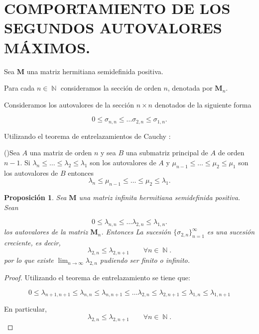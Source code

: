 \documentclass[11pt]{article}
\newtheorem{prop1}{Proposici\'{o}n}%
\newenvironment{prop}{\begin{prop1}\rm}{\end{prop1}}
\DeclareMathOperator{\NN}{\mathbb N}%
\begin{document}
\section{COMPORTAMIENTO DE LOS SEGUNDOS AUTOVALORES MÁXIMOS.} 



\noindent Sea $\mathbf{M}$ una matriz hermitiana semidefinida positiva. 

\noindent Para cada $n\in \NN$ consideramos la sección de orden $n$, denotada por $\mathbf{M}_n$. 

\noindent Consideramos los autovalores de la sección $n\times n$ denotados de la siguiente forma 
 
$$
0 \leq \sigma_{n,n}\leq \dots \sigma_{2,n} \leq \sigma_{1,n}.
$$

\noindent Utilizando el teorema de entrelazamientos de Cauchy : 

\bigskip

 (\cite{Bhatia})Sea  $A$ una matriz de orden  $n$ y sea  $B$ una submatriz principal de  $A$ de  orden  $n-1$. Si $\lambda_n\leq \dots \leq \lambda_2\leq \lambda_1$ son los autovalores de $A$ y  $\mu_{n-1}\leq \dots \leq \mu_2\leq \mu_1$ son los autovalores de  $B$ entonces 
$$
\lambda_n \leq \mu_{n-1} \leq \dots \leq \mu_2 \leq \lambda_1.
$$


 \begin{prop} Sea $\mathbf{M}$ una matriz infinita  hermitiana semidefinida positiva. Sean 
 
$$
0 \leq \lambda_{n,n}\leq \dots \lambda_{2,n} \leq \lambda_{1,n}.
$$
\noindent los autovalores de la matriz $\mathbf{M}_n$. Entonces La sucesión $\{ \sigma_{2,n}\}_{n=1}^{\infty}$ es una sucesión creciente, es decir, 
$$
\lambda_{2,n} \leq \lambda_{2,n+1} \qquad \forall n\in \NN.
$$ 
\noindent por lo que existe $\displaystyle{\lim_{n\to \infty} \lambda_{2,n}}$ pudiendo ser finito o infinito. 
\end{prop} 


\begin{proof} Utilizando el teorema de entrelazamiento se tiene que: 

$$
0 \leq \lambda_{n+1,n+1} \leq \lambda_{n,n} \leq\lambda_{n,n+1} \leq \dots \lambda_{2,n}  \leq \lambda_{2,n+1} \leq \lambda_{1,n} \leq \lambda_{1,n+1}
$$

\noindent En particular, 
$$
\lambda_{2,n} \leq \lambda_{2,n+1} \qquad \forall n\in \NN.
$$
\end{proof} 
\end{document}
